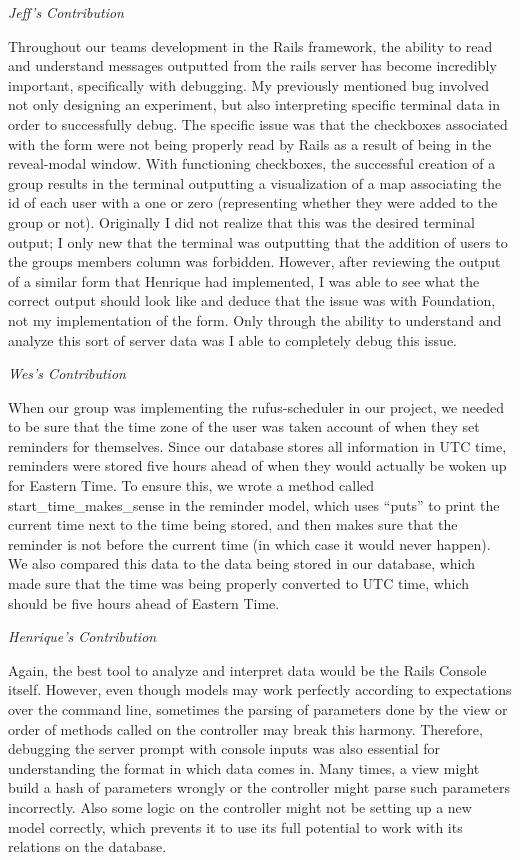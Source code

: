 \documentclass[11pt]{article}
\begin{document}
\textit{Jeff's Contribution}

Throughout our teams development in the Rails framework, the ability to read and understand messages outputted from the rails server has become incredibly important, specifically with debugging.  My previously mentioned bug involved not only designing an experiment, but also interpreting specific terminal data in order to successfully debug.  The specific issue was that the checkboxes associated with the form were not being properly read by Rails as a result of being in the reveal-modal window.  With functioning checkboxes, the successful creation of a group results in the terminal outputting a visualization of a map associating the id of each user with a one or zero (representing whether they were added to the group or not).  Originally I did not realize that this was the desired terminal output; I only new that the terminal was outputting that the addition of users to the groups members column was forbidden.  However, after reviewing the output of a similar form that Henrique had implemented, I was able to see what the correct output should look like and deduce that the issue was with Foundation, not my implementation of the form.  Only through the ability to understand and analyze this sort of server data was I able to completely debug this issue.

\textit{Wes's Contribution}

When our group was implementing the rufus-scheduler in our project, we needed to be sure that the time zone of the user was taken account of when they set reminders for themselves.  Since our database stores all information in UTC time, reminders were stored five hours ahead of when they would actually be woken up for Eastern Time.  To ensure this, we wrote a method called start_time_makes_sense in the reminder model, which uses “puts” to print the current time next to the time being stored, and then makes sure that the reminder is not before the current time (in which case it would never happen).  We also compared this data to the data being stored in our database, which made sure that the time was being properly converted to UTC time, which should be five hours ahead of Eastern Time.

\textit{Henrique's Contribution}

Again, the best tool to analyze and interpret data would be the Rails Console itself. However, even though models may work perfectly according to expectations over the command line, sometimes the parsing of parameters done by the view or order of methods called on the controller may break this harmony. Therefore, debugging the server prompt with console inputs was also essential for understanding the format in which data comes in. Many times, a view might build a hash of parameters wrongly or the controller might parse such parameters incorrectly. Also some logic on the controller might not be setting up a new model correctly, which prevents it to use its full potential to work with its relations on the database.
\end{document}
